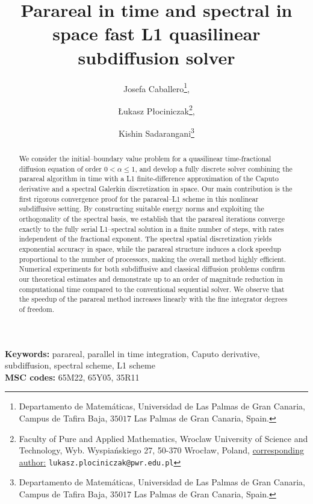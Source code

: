 \documentclass[12pt,a4paper]{article}
\title{Parareal in time and spectral in space fast L1 quasilinear subdiffusion solver}
\author{
Josefa Caballero\thanks{Departamento de Matem\'aticas, Universidad de Las Palmas de Gran Canaria, Campus de Tafira Baja, $35017$ Las Palmas de Gran Canaria, Spain.}, \and
{\L}ukasz P{\l}ociniczak\thanks{Faculty of Pure and Applied Mathematics, Wroclaw University of Science and Technology, Wyb. Wyspia\'nskiego 27, 50-370 Wroc{\l}aw, Poland, \underline{corresponding author:} \texttt{lukasz.plociniczak@pwr.edu.pl}}, \vspace{4pt}\and
Kishin  Sadarangani\thanks{Departamento de Matem\'aticas, Universidad de Las Palmas de Gran Canaria, Campus de Tafira Baja, $35017$ Las Palmas de Gran Canaria, Spain.}
}
\date{}
\begin{document}
\maketitle

\begin{abstract}
	We consider the initial–boundary value problem for a quasilinear time‑fractional diffusion equation of order $0<\alpha\leq 1$, and develop a fully discrete solver combining the parareal algorithm in time with a L1 finite‑difference approximation of the Caputo derivative and a spectral Galerkin discretization in space. Our main contribution is the first rigorous convergence proof for the parareal–L1 scheme in this nonlinear subdiffusive setting. By constructing suitable energy norms and exploiting the orthogonality of the spectral basis, we establish that the parareal iterations converge exactly to the fully serial L1–spectral solution in a finite number of steps, with rates independent of the fractional exponent. The spectral spatial discretization yields exponential accuracy in space, while the parareal structure induces a clock speedup proportional to the number of processors, making the overall method highly efficient. Numerical experiments for both subdiffusive and classical diffusion problems confirm our theoretical estimates and demonstrate up to an order of magnitude reduction in computational time compared to the conventional sequential solver. We observe that the speedup of the parareal method increases linearly with the fine integrator degrees of freedom. 
\end{abstract}

\textbf{Keywords:} parareal, parallel in time integration, Caputo derivative, subdiffusion, spectral scheme, L1 scheme \\

\textbf{MSC codes:} 65M22, 65Y05, 35R11
\end{document}
